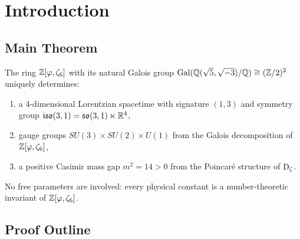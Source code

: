 \chapter{Introduction}

\section{Main Theorem}

\begin{theorem}
\label{thm:fust}
The ring $\mathbb{Z}[\varphi,\zeta_6]$ with its natural Galois group
$\mathrm{Gal}(\mathbb{Q}(\sqrt5,\sqrt{-3})/\mathbb{Q}) \cong (\mathbb{Z}/2)^2$
uniquely determines:
\begin{enumerate}
  \item a 4-dimensional Lorentzian spacetime with signature $(1,3)$
    and symmetry group $\mathfrak{iso}(3,1) = \mathfrak{so}(3,1) \ltimes \mathbb{R}^4$,
  \item gauge groups $SU(3) \times SU(2) \times U(1)$
    from the Galois decomposition of $\mathbb{Z}[\varphi,\zeta_6]$,
  \item a positive Casimir mass gap $m^2 = 14 > 0$
    from the Poincar\'{e} structure of $\operatorname{D_\zeta}$.
\end{enumerate}
No free parameters are involved:
every physical constant is a number-theoretic invariant of $\mathbb{Z}[\varphi,\zeta_6]$.
\end{theorem}

\section{Proof Outline}

